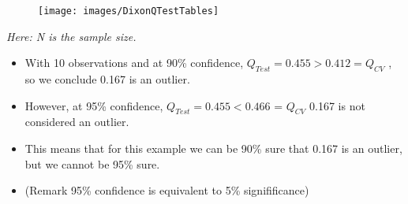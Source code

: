 \documentclass[a4paper,12pt]{article}
\begin{document}
\begin{figure}
	\centering
	\texttt{[image: images/DixonQTestTables]}
	\caption{}
	\label{fig:dixonqtesttables}
\end{figure}

\textit{Here: N is the sample size.}

\begin{itemize}
	\item	With 10 observations and at 90\% confidence, $Q_{Test} = 0.455 > 0.412 =Q_{CV}$ , so we conclude 0.167 is an outlier.
	\item  However, at 95\% confidence, $Q_{Test} = 0.455 < 0.466$ = $Q_{CV}$ 0.167 is not considered an outlier. 
	
	\item This means that for this example we can be 90\% sure that 0.167 is an outlier, but we cannot be 95\% sure.
	\bigskip
	\item (Remark 95\% confidence is equivalent to 5\% signifificance)
\end{itemize}
\end{document}
